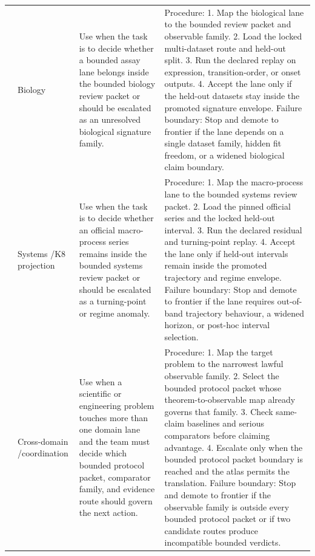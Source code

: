 \begin{longtable}{@{}L{0.15\textwidth}L{0.13\textwidth}L{0.18\textwidth}L{0.38\textwidth}@{}}
 & Biology & Use when the task is to decide whether a bounded assay lane belongs inside the bounded biology review packet or should be escalated as an unresolved biological signature family. & Procedure: 1. Map the biological lane to the bounded review packet and observable family. 2. Load the locked multi-dataset route and held-out split. 3. Run the declared replay on expression, transition-order, or onset outputs. 4. Accept the lane only if the held-out datasets stay inside the promoted signature envelope. \allowbreak Failure boundary: Stop and demote to frontier if the lane depends on a single dataset family, hidden fit freedom, or a widened biological claim boundary. \\
 & Systems /\allowbreak K8 projection & Use when the task is to decide whether an official macro-process series remains inside the bounded systems review packet or should be escalated as a turning-point or regime anomaly. & Procedure: 1. Map the macro-process lane to the bounded systems review packet. 2. Load the pinned official series and the locked held-out interval. 3. Run the declared residual and turning-point replay. 4. Accept the lane only if held-out intervals remain inside the promoted trajectory and regime envelope. \allowbreak Failure boundary: Stop and demote to frontier if the lane requires out-of-band trajectory behaviour, a widened horizon, or post-hoc interval selection. \\
 & Cross-domain /\allowbreak coordination & Use when a scientific or engineering problem touches more than one domain lane and the team must decide which bounded protocol packet, comparator family, and evidence route should govern the next action. & Procedure: 1. Map the target problem to the narrowest lawful observable family. 2. Select the bounded protocol packet whose theorem-to-observable map already governs that family. 3. Check same-claim baselines and serious comparators before claiming advantage. 4. Escalate only when the bounded protocol packet boundary is reached and the atlas permits the translation. \allowbreak Failure boundary: Stop and demote to frontier if the observable family is outside every bounded protocol packet or if two candidate routes produce incompatible bounded verdicts. \\
\bottomrule
\end{longtable}

